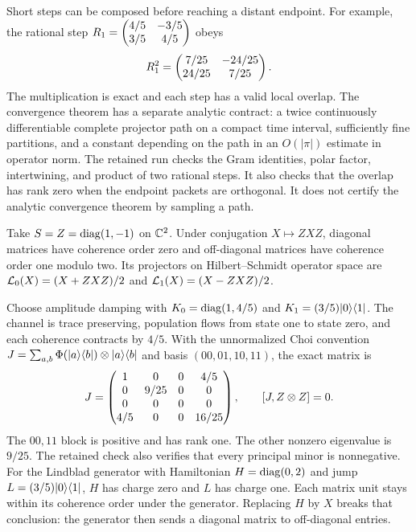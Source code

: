 Short steps can be composed before reaching a distant endpoint. For example, the rational step $R_1=\begin{pmatrix}4/5&-3/5\\3/5&4/5\end{pmatrix}$ obeys
\[
R_1^2=\begin{pmatrix}7/25&-24/25\\24/25&7/25\end{pmatrix}.
\]
The multiplication is exact and each step has a valid local overlap. The convergence theorem has a separate analytic contract: a twice continuously differentiable complete projector path on a compact time interval, sufficiently fine partitions, and a constant depending on the path in an $O(|\pi|)$ estimate in operator norm.
The retained run checks the Gram identities, polar factor, intertwining, and product of two rational steps. It also checks that the overlap has rank zero when the endpoint packets are orthogonal. It does not certify the analytic convergence theorem by sampling a path.

Take $S=Z=\operatorname{diag}(1,-1)$ on $\mathbb C^2$. Under conjugation $X\mapsto ZXZ$, diagonal matrices have coherence order zero and off-diagonal matrices have coherence order one modulo two. Its projectors on Hilbert--Schmidt operator space are $\mathcal L_0(X)=(X+ZXZ)/2$ and $\mathcal L_1(X)=(X-ZXZ)/2$.

Choose amplitude damping with $K_0=\operatorname{diag}(1,4/5)$ and $K_1=(3/5)\lvert 0\rangle\langle 1\rvert$. The channel is trace preserving, population flows from state one to state zero, and each coherence contracts by $4/5$.
With the unnormalized Choi convention $J=\sum_{a,b}\Phi(\lvert a\rangle\langle b\rvert)\otimes\lvert a\rangle\langle b\rvert$ and basis $(00,01,10,11)$, the exact matrix is
\[
J=\begin{pmatrix}1&0&0&4/5\\0&9/25&0&0\\0&0&0&0\\4/5&0&0&16/25\end{pmatrix},
\qquad [J,Z\otimes Z]=0.
\]
The $00,11$ block is positive and has rank one. The other nonzero eigenvalue is $9/25$. The retained check also verifies that every principal minor is nonnegative.
For the Lindblad generator with Hamiltonian $H=\operatorname{diag}(0,2)$ and jump $L=(3/5)\lvert 0\rangle\langle 1\rvert$, $H$ has charge zero and $L$ has charge one. Each matrix unit stays within its coherence order under the generator. Replacing $H$ by $X$ breaks that conclusion: the generator then sends a diagonal matrix to off-diagonal entries.

